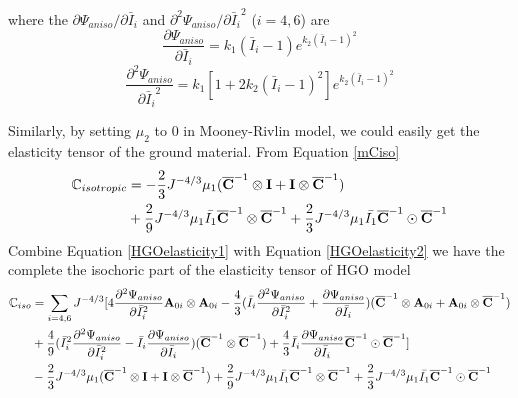 where the $\partial\Psi_{aniso}/\partial{\bar{I}_i}$ and $\partial^2\Psi_{aniso}/{\partial{\bar{I}_i}^2}$ ($i = 4, 6$) are
\begin{equation} \label{HGOderivative1}
\frac{\partial\Psi_{aniso}}{\partial{\bar{I}_i}} = k_1(\bar{I}_i - 1)e^{k_2(\bar{I}_i - 1)^2}
\end{equation}
\begin{equation} \label{HGOderivative2}
\frac{\partial^2\Psi_{aniso}}{\partial{\bar{I}_i}^2} = k_1[1+2k_2(\bar{I}_i - 1)^2]e^{k_2(\bar{I}_i - 1)^2}
\end{equation}

Similarly, by setting $\mu_2$ to $0$ in Mooney-Rivlin model, we could easily get the elasticity tensor of the ground material. From Equation \ref{mCiso}
\begin{equation} \label{HGOelasticity2}
\begin{split}
\mathbb{C}_{isotropic} &=
- \frac{2}{3}J^{-4/3}\mu_1({\overline{\bold{C}}}^{-1} \otimes \bold{I} + \bold{I} \otimes {\overline{\bold{C}}}^{-1})  \\
&+
\frac{2}{9}J^{-4/3}\mu_1\bar{I_1}  {\overline{\bold{C}}}^{-1} \otimes {\overline{\bold{C}}}^{-1} + \frac{2}{3}J^{-4/3} \mu_1\bar{I_1} {\overline{\bold{C}}}^{-1} \odot {\overline{\bold{C}}}^{-1} 
\end{split}
\end{equation}
Combine Equation \ref{HGOelasticity1} with Equation \ref{HGOelasticity2} we have the complete the isochoric part of the elasticity tensor of HGO model
\begin{equation} \label{HGOelasticity}
\begin{split}
\mathbb{C}_{iso} &= 
\sum_{i = 4, 6} J^{-4/3}[4\frac{\partial^2\Psi_{aniso}}{\partial{\bar{I}_i}^2} \bold{A}_{0i} \otimes \bold{A}_{0i} - \frac{4}{3}(\bar{I}_i\frac{\partial^2\Psi_{aniso}}{\partial{\bar{I}_i}^2} + \frac{\partial\Psi_{aniso}}{\partial{\bar{I}_i}})(\overline{\bold{C}}^{-1} \otimes \bold{A}_{0i} + \bold{A}_{0i} \otimes \overline{\bold{C}}^{-1}) \\
&+ \frac{4}{9}({\bar{I}_i}^2\frac{\partial^2\Psi_{aniso}}{\partial{\bar{I}_i}^2} - \bar{I}_i\frac{\partial\Psi_{aniso}}{\partial{\bar{I}_i}})(\overline{\bold{C}}^{-1} \otimes \overline{\bold{C}}^{-1}) 
+ \frac{4}{3}\bar{I}_i \frac{\partial\Psi_{aniso}}{\partial{\bar{I}_i}} \overline{\bold{C}}^{-1} \odot \overline{\bold{C}}^{-1}] \\
&- \frac{2}{3}J^{-4/3}\mu_1({\overline{\bold{C}}}^{-1} \otimes \bold{I} + \bold{I} \otimes {\overline{\bold{C}}}^{-1})  +
\frac{2}{9}J^{-4/3}\mu_1\bar{I_1}  {\overline{\bold{C}}}^{-1} \otimes {\overline{\bold{C}}}^{-1} + \frac{2}{3}J^{-4/3} \mu_1\bar{I_1} {\overline{\bold{C}}}^{-1} \odot {\overline{\bold{C}}}^{-1} 
\end{split}
\end{equation}

















